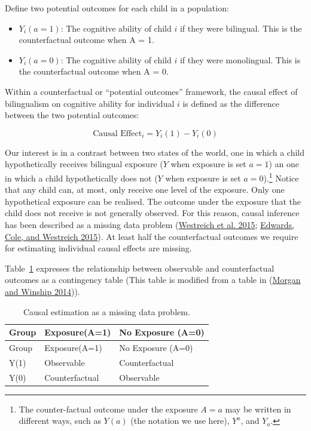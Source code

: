 \documentclass[
  singlecolumn]{report}
\providecommand{\tightlist}{%
  \setlength{\itemsep}{0pt}\setlength{\parskip}{0pt}}\usepackage{longtable,booktabs,array}
\begin{document}
Define two potential outcomes for each child in a population:

\begin{itemize}
\tightlist
\item
  \(Y_i(a = 1)\): The cognitive ability of child \(i\) if they were
  bilingual. This is the counterfactual outcome when A = 1.
\item
  \(Y_i(a = 0)\): The cognitive ability of child \(i\) if they were
  monolingual. This is the counterfactual outcome when A = 0.
\end{itemize}

Within a counterfactual or ``potential outcomes'' framework, the causal
effect of bilingualism on cognitive ability for individual \(i\) is
defined as the difference between the two potential outcomes:

\[
\text{Causal Effect}_i = Y_i(1) - Y_i(0) 
\]

Our interest is in a contrast between two states of the world, one in
which a child hypothetically receives bilingual exposure (\(Y\) when
exposure is set \(a=1\)) an one in which a child hypothetically does not
(\(Y\) when exposure is set \(a=0\)).\footnote{The counter-factual
  outcome under the exposure \(A = a\) may be written in different ways,
  such as \(Y(a)\) (the notation we use here), \(Y^a\), and \(Y_a\).}
Notice that any child can, at most, only receive one level of the
exposure. Only one hypothetical exposure can be realised. The outcome
under the exposure that the child does not receive is not generally
observed. For this reason, causal inference has been described as a
missing data problem (\protect\hyperlink{ref-westreich2015}{Westreich et
al. 2015}; \protect\hyperlink{ref-edwards2015}{Edwards, Cole, and
Westreich 2015}). At least half the counterfactual outcomes we require
for estimating individual causal effects are missing.

Table~\ref{tbl-consistency} expresses the relationship between
observable and counterfactual outcomes as a contingency table (This
table is modified from a table in
(\protect\hyperlink{ref-morgan2014}{Morgan and Winship 2014})).

\hypertarget{tbl-consistency}{}
\begin{longtable}[]{@{}lll@{}}
\caption{\label{tbl-consistency}Causal estimation as a missing data
problem.}\tabularnewline
\toprule\noalign{}
Group & Exposure(A=1) & No Exposure (A=0) \\
\midrule\noalign{}
\endfirsthead
\toprule\noalign{}
Group & Exposure(A=1) & No Exposure (A=0) \\
\midrule\noalign{}
\endhead
\bottomrule\noalign{}
\endlastfoot
Y(1) & Observable & Counterfactual \\
Y(0) & Counterfactual & Observable \\
\end{longtable}
\end{document}
